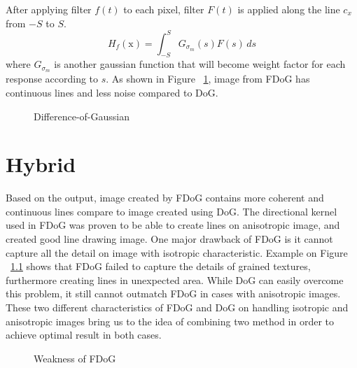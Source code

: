 After applying filter $f(t)$ to each pixel, filter $F(t)$ is applied along the line $c_{x}$ from $-S$ to $S$. 
\begin{equation}
	H_{f}(\mbox{x}) = \int_{-S}^{S} G_{\sigma_{m}}(s)F(s)\,ds
\end{equation}
where $G_{\sigma_{m}}$ is another gaussian function that will become weight factor for each response according to $s$. As shown in Figure ~\ref{fig:FDoG}, image from FDoG has continuous lines and less noise compared to DoG.

\begin{figure}[H]
	\centering
	\caption{Difference-of-Gaussian}\label{fig:FDoG}	
\end{figure}


\chapter{Hybrid}
Based on the output, image created by FDoG contains more coherent and continuous lines compare to image created using DoG. The directional kernel used in FDoG was proven to be able to create lines on anisotropic image, and created good line drawing image. One major drawback of FDoG is it cannot capture all the detail on image with isotropic characteristic. Example on Figure ~\ref{fig:FDoGWeakness} shows that FDoG failed to capture the details of grained textures, furthermore creating lines in unexpected area. While DoG can easily overcome this problem, it still cannot outmatch FDoG in cases with anisotropic images. These two different characteristics of FDoG and DoG on handling isotropic and anisotropic images bring us to the idea of combining two method in order to achieve optimal result in both cases.

\begin{figure}[H]
	\centering
	\caption{Weakness of FDoG}\label{fig:FDoGWeakness}
\end{figure}

